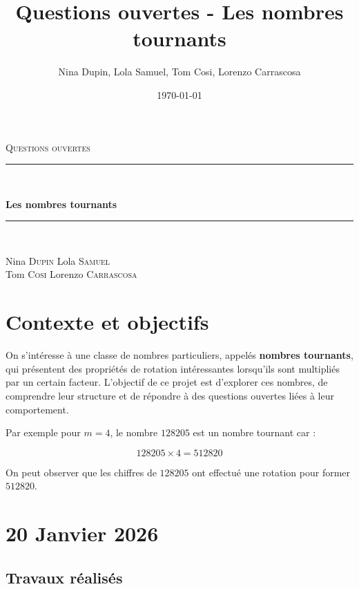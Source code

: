 \documentclass[a4paper,12pt]{article}
\title{Questions ouvertes - Les nombres tournants}
\date{\today}
\author{Nina Dupin, Lola Samuel, Tom Cosi, Lorenzo Carrascosa}
\begin{document}
\begin{titlepage}
    \centering
    \vspace*{2cm}

    {\scshape\Large Questions ouvertes \par}
    \vspace{2cm}

    \rule{\linewidth}{0.5mm} \\[0.4cm]
    {\huge\bfseries Les nombres tournants \par}
    \rule{\linewidth}{0.5mm} \\[1.5cm]

    \vspace{2cm}

    {\Large
    Nina \textsc{Dupin} \quad Lola \textsc{Samuel} \\[0.3cm]
    Tom \textsc{Cosi} \quad Lorenzo \textsc{Carrascosa} \par}

    \vfill
\end{titlepage}

\clearpage
\tableofcontents
\clearpage

\section{Contexte et objectifs}

On s'intéresse à une classe de nombres particuliers, appelés \textbf{nombres tournants}, qui présentent des propriétés de rotation intéressantes lorsqu'ils sont multipliés par un certain facteur.
L'objectif de ce projet est d'explorer ces nombres, de comprendre leur structure et de répondre à des questions ouvertes liées à leur comportement.

Par exemple pour $m = 4$, le nombre $128205$ est un nombre tournant car :

$$
128205 \times 4 = 512820
$$

On peut observer que les chiffres de $128205$ ont effectué une rotation pour former $512820$.

\clearpage

\section{20 Janvier 2026}

\subsection*{Travaux réalisés}
\end{document}
